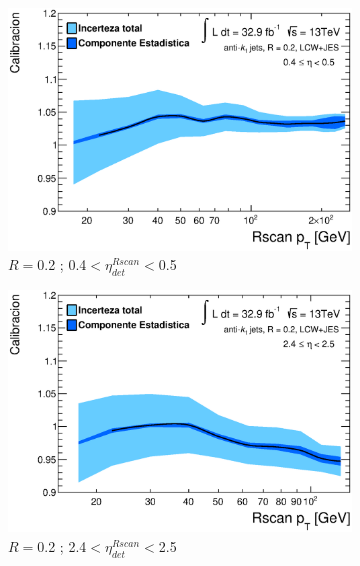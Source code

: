 \begin{figure}[ht]
    \centering
    \begin{subfigure}[b]{0.495\textwidth}
        \centering
        \includegraphics[width=\textwidth]{images/Final2LC/Calibration_Eta_49.eps}
        \caption{$R=$0.2 ; 0.4$<\eta^{Rscan}_{det}<$0.5}
    \end{subfigure}
    \hfill
    \begin{subfigure}[b]{0.495\textwidth}
        \centering
        \includegraphics[width=\textwidth]{images/Final2LC/Calibration_Eta_69.eps}
        \caption{$R=$0.2 ; 2.4$<\eta^{Rscan}_{det}<$2.5}
    \end{subfigure}
    \vfill
    \begin{subfigure}[b]{0.495\textwidth}

\end{subfigure}
\end{figure}
